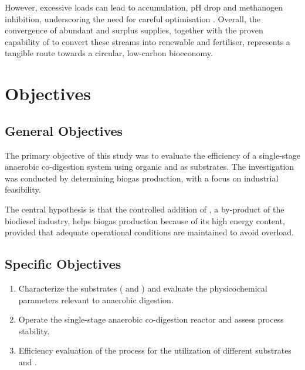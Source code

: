 However, excessive  loads can lead to  accumulation, pH drop and methanogen inhibition, underscoring the need for careful optimisation \parencite{gebreegziabher2025, tomczak2025}. Overall, the convergence of abundant  and surplus  supplies, together with the proven capability of  to convert these streams into renewable  and fertiliser, represents a tangible route towards a circular, low-carbon bioeconomy.

\chapter{Objectives}
\label{ch:objectives}

\section{General Objectives}
\label{sec:general_objectives}

The primary objective of this study was to evaluate the efficiency of a single-stage anaerobic co-digestion system using organic  and  as substrates. The investigation was conducted by determining biogas production, with a focus on industrial feasibility.

The central hypothesis is that the controlled addition of , a by-product of the biodiesel industry, helps biogas production because of its high energy content, provided that adequate operational conditions are maintained to avoid  overload.

\section{Specific Objectives}
\label{sec:specific_objectives}

\begin{enumerate}
    \item Characterize the substrates ( and ) and evaluate the physicochemical parameters relevant to anaerobic digestion.
    \item Operate the single-stage anaerobic co-digestion reactor and assess process stability.
    \item Efficiency evaluation of the process for the utilization of different substrates and .
\end{enumerate}

